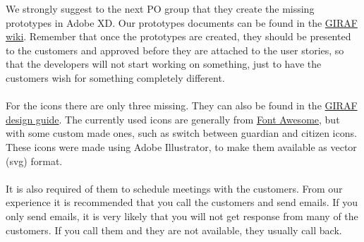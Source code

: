 \noindent
We strongly suggest to the next PO group that they create the missing prototypes in Adobe XD.
Our prototypes documents can be found in the \href{https://github.com/aau-giraf/wiki/tree/master/design_guide/prototypes}{GIRAF wiki}. 
Remember that once the prototypes are created, they should be presented to the customers and approved before they are attached to the user stories, so that the developers will not start working on something, just to have the customers wish for something completely different.
\\\\
For the icons there are only three missing. They can also be found in the \href{https://github.com/aau-giraf/wiki/blob/master/design_guide/icons.md}{GIRAF design guide}. 
The currently used icons are generally from \href{https://fontawesome.com/}{Font Awesome}, but with some custom made ones, such as switch between guardian and citizen icons.
These icons were made using Adobe Illustrator, to make them available as vector (svg) format.
\\\\
It is also required of them to schedule meetings with the customers.
From our experience it is recommended that you call the customers and send emails. 
If you only send emails, it is very likely that you will not get response from many of the customers. 
If you call them and they are not available, they usually call back.
